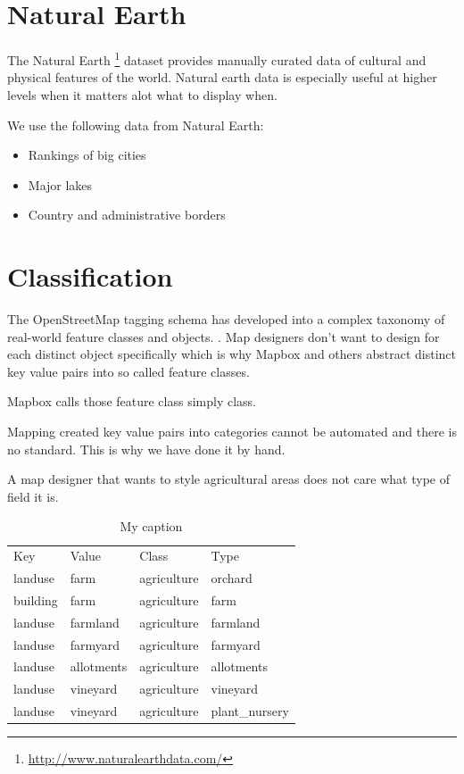 \section{Natural Earth}

The Natural Earth \footnote{\url{http://www.naturalearthdata.com/}} dataset provides manually curated data of cultural and physical features of the world. Natural earth data is especially useful at higher levels when it matters alot what to display when.

We use the following data from Natural Earth:

\begin{itemize}
\item Rankings of big cities
\item Major lakes
\item Country and administrative borders
\end{itemize}

\section{Classification}
\label{classification}

The OpenStreetMap tagging schema has developed into a complex taxonomy of real-world feature classes and objects. \cite[p. 15]{haklay2008openstreetmap}. Map designers don't want to design
for each distinct object specifically which is why Mapbox and others abstract distinct key value pairs into so called feature classes.

Mapbox calls those feature class simply class.

Mapping created key value pairs into categories cannot be automated
and there is no standard. This is why we have done it by hand.

A map designer that wants to style agricultural areas does not care
what type of field it is.

\begin{table}[]
\centering
\caption{My caption}
\label{my-label}
\begin{tabular}{llll}
Key      & Value      & Class       & Type           \\
landuse  & farm       & agriculture & orchard        \\
building & farm       & agriculture & farm           \\
landuse  & farmland   & agriculture & farmland       \\
landuse  & farmyard   & agriculture & farmyard       \\
landuse  & allotments & agriculture & allotments     \\
landuse  & vineyard   & agriculture & vineyard       \\
landuse  & vineyard   & agriculture & plant\_nursery
\end{tabular}
\end{table}

